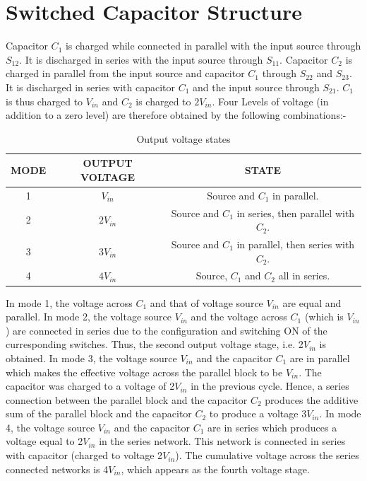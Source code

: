 \documentclass[12pt,a4paper]{report}
\begin{document}
\section{Switched Capacitor Structure}

Capacitor $C_1$ is charged while connected in parallel with the input source through $S_{12}$. It is discharged in series with the input source through $S_{11}$. Capacitor $C_2$ is charged in parallel from the input source and capacitor $C_1$ through $S_{22}$ and $S_{23}$. It is discharged in series with capacitor $C_1$ and the input source through $S_{21}$. $C_1$ is thus charged to $V_{in}$ and $C_2$ is charged to $2V_{in}$. Four Levels of voltage (in addition to a zero level) are therefore obtained by the following combinations:-\\

\begin{table}[h!]
\begin{center}
	\begin{tabular}{|c|c|c|} 
		\hline
		{\bf MODE} & {\bf OUTPUT VOLTAGE} & {\bf STATE} \\  
		\hline
		1 & $V_{in}$  & Source and $C_1$ in parallel. \\ 
		\hline
		2 & $2V_{in}$ & Source and $C_1$ in series, then parallel with $C_2$. \\
		\hline
		3 & $3V_{in}$ & Source and $C_1$ in parallel, then series with $C_2$. \\
		\hline
		4 & $4V_{in}$ & Source, $C_1$ and $C_2$ all in series. \\
		\hline
	\end{tabular}
\end{center}
\caption{Output voltage states}
\end{table}

In mode 1, the voltage across $C_1$ and that of voltage source $V_{in}$ are equal and parallel. In mode 2, the voltage source $V_{in}$ and the voltage across $C_1$ (which is $V_{in}$) are connected in series due to the configuration and switching ON of the curresponding switches. Thus, the second output voltage stage, i.e. 2$V_{in}$ is obtained. In mode 3, the voltage source $V_{in}$ and the capacitor $C_1$ are in parallel which makes the effective voltage across the parallel block to be $V_{in}$. The capacitor was charged to a voltage of 2$V_{in}$ in the previous cycle. Hence, a series connection between the parallel block and the capacitor $C_2$ produces the additive sum of the parallel block and the capacitor $C_2$ to produce a voltage 3$V_{in}$. In mode 4, the voltage source $V_{in}$ and the capacitor $C_1$ are in series which produces a voltage equal to 2$V_{in}$ in the series network. This network is connected in series with capacitor (charged to voltage 2$V_{in}$). The cumulative voltage across the series connected networks is 4$V_{in}$, which appears as the fourth voltage stage. \\
\end{document}
